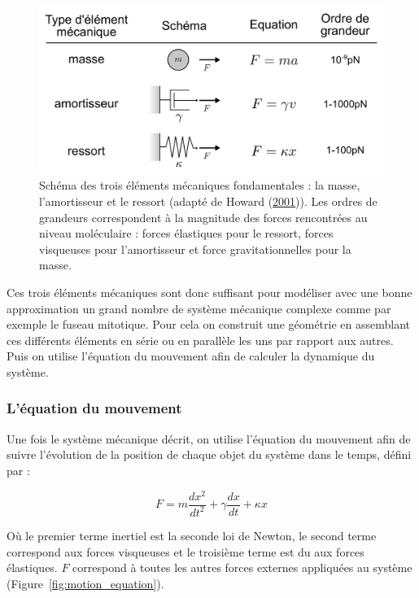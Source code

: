 \documentclass[12pt,a4paper,twoside,openright]{book}
\begin{document}
\begin{figure}[htbp]
\centering
\includegraphics{figures/results/modelling/force_types.png}
\caption[Schéma des trois éléments mécaniques fondamentales]{\label{fig:force_types}Schéma
des trois éléments mécaniques fondamentales : la masse, l'amortisseur et
le ressort (adapté de Howard (\hyperref[ref-Howard2001]{2001})). Les
ordres de grandeurs correspondent à la magnitude des forces rencontrées
au niveau moléculaire : forces élastiques pour le ressort, forces
visqueuses pour l'amortisseur et force gravitationnelles pour la masse.}
\end{figure}

Ces trois éléments mécaniques sont donc suffisant pour modéliser avec
une bonne approximation un grand nombre de système mécanique complexe
comme par exemple le fuseau mitotique. Pour cela on construit une
géométrie en assemblant ces différents éléments en série ou en parallèle
les uns par rapport aux autres. Puis on utilise l'équation du mouvement
afin de calculer la dynamique du système.

\subsubsection{L'équation du mouvement}\label{luxe9quation-du-mouvement}

Une fois le système mécanique décrit, on utilise l'équation du mouvement
afin de suivre l'évolution de la position de chaque objet du système
dans le temps, défini par :

\[
F = m\frac{dx^2}{dt^2} + \gamma\frac{dx}{dt} + \kappa x
\]

Où le premier terme inertiel est la seconde loi de Newton, le second
terme correspond aux forces visqueuses et le troisième terme est du aux
forces élastiques. \(F\) correspond à toutes les autres forces externes
appliquées au système (Figure~\ref{fig:motion_equation}).
\end{document}

